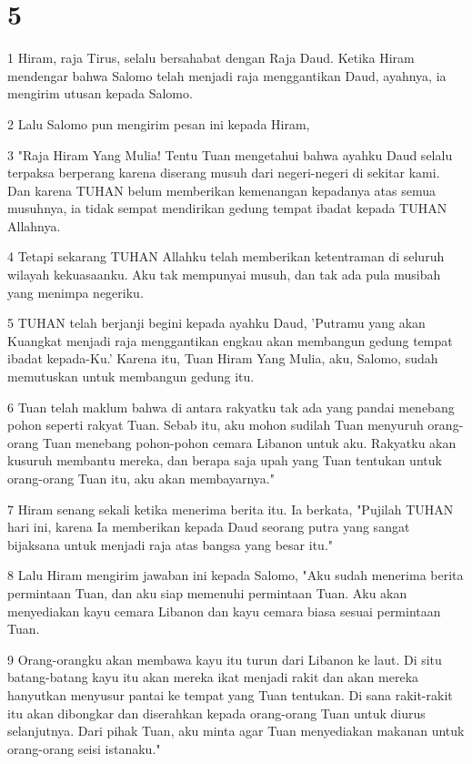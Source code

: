 \chapter{5}

\par 1 Hiram, raja Tirus, selalu bersahabat dengan Raja Daud. Ketika Hiram mendengar bahwa Salomo telah menjadi raja menggantikan Daud, ayahnya, ia mengirim utusan kepada Salomo.
\par 2 Lalu Salomo pun mengirim pesan ini kepada Hiram,
\par 3 "Raja Hiram Yang Mulia! Tentu Tuan mengetahui bahwa ayahku Daud selalu terpaksa berperang karena diserang musuh dari negeri-negeri di sekitar kami. Dan karena TUHAN belum memberikan kemenangan kepadanya atas semua musuhnya, ia tidak sempat mendirikan gedung tempat ibadat kepada TUHAN Allahnya.
\par 4 Tetapi sekarang TUHAN Allahku telah memberikan ketentraman di seluruh wilayah kekuasaanku. Aku tak mempunyai musuh, dan tak ada pula musibah yang menimpa negeriku.
\par 5 TUHAN telah berjanji begini kepada ayahku Daud, 'Putramu yang akan Kuangkat menjadi raja menggantikan engkau akan membangun gedung tempat ibadat kepada-Ku.' Karena itu, Tuan Hiram Yang Mulia, aku, Salomo, sudah memutuskan untuk membangun gedung itu.
\par 6 Tuan telah maklum bahwa di antara rakyatku tak ada yang pandai menebang pohon seperti rakyat Tuan. Sebab itu, aku mohon sudilah Tuan menyuruh orang-orang Tuan menebang pohon-pohon cemara Libanon untuk aku. Rakyatku akan kusuruh membantu mereka, dan berapa saja upah yang Tuan tentukan untuk orang-orang Tuan itu, aku akan membayarnya."
\par 7 Hiram senang sekali ketika menerima berita itu. Ia berkata, "Pujilah TUHAN hari ini, karena Ia memberikan kepada Daud seorang putra yang sangat bijaksana untuk menjadi raja atas bangsa yang besar itu."
\par 8 Lalu Hiram mengirim jawaban ini kepada Salomo, "Aku sudah menerima berita permintaan Tuan, dan aku siap memenuhi permintaan Tuan. Aku akan menyediakan kayu cemara Libanon dan kayu cemara biasa sesuai permintaan Tuan.
\par 9 Orang-orangku akan membawa kayu itu turun dari Libanon ke laut. Di situ batang-batang kayu itu akan mereka ikat menjadi rakit dan akan mereka hanyutkan menyusur pantai ke tempat yang Tuan tentukan. Di sana rakit-rakit itu akan dibongkar dan diserahkan kepada orang-orang Tuan untuk diurus selanjutnya. Dari pihak Tuan, aku minta agar Tuan menyediakan makanan untuk orang-orang seisi istanaku."
